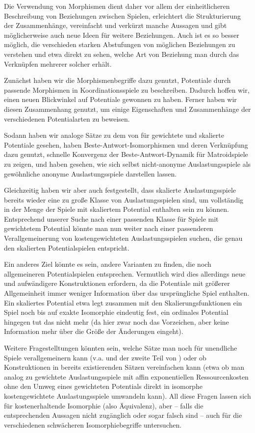 \documentclass[a4paper,ngerman,11pt,bibliography=totoc]{scrartcl}
\theoremstyle{definition}
\theoremstyle{plain}
\theoremstyle{remark}
\begin{document}
Die Verwendung von Morphismen dient daher vor allem der einheitlicheren Beschreibung von Beziehungen zwischen Spielen, erleichtert die Strukturierung der Zusammenhänge, vereinfacht und verkürzt manche Aussagen und gibt möglicherweise auch neue Ideen für weitere Beziehungen. Auch ist es so besser möglich, die verschieden starken Abstufungen von möglichen Beziehungen zu verstehen und etwa direkt zu sehen, welche Art von Beziehung man durch das Verknüpfen mehrerer solcher erhält.

Zunächst haben wir die Morphismenbegriffe dazu genutzt, Potentiale durch passende Morphismen in Koordinationsspiele zu beschreiben. Dadurch hoffen wir, einen neuen Blickwinkel auf Potentiale gewonnen zu haben. Ferner haben wir diesen Zusammenhang genutzt, um einige Eigenschaften und Zusammenhänge der verschiedenen Potentialarten zu beweisen.

Sodann haben wir analoge Sätze zu dem von \citeauthor{MonShap} für gewichtete und skalierte Potentiale gesehen, haben Beste-Antwort-Isomorphismen und deren Verknüpfung dazu genutzt, schnelle Konvergenz der Beste-Antwort-Dynamik für Matroidspiele zu zeigen, und haben gesehen, wie sich selbst nicht-anonyme Auslastungsspiele als gewöhnliche anonyme Auslastungsspiele darstellen lassen.

Gleichzeitig haben wir aber auch festgestellt, dass skalierte Auslastungsspiele bereits wieder eine zu große Klasse von Auslastungsspielen sind, um vollständig in der Menge der Spiele mit skaliertem Potential enthalten sein zu können. Entsprechend unserer Suche nach einer passenden Klasse für Spiele mit gewichtetem Potential könnte man nun weiter nach einer passenderen Verallgemeinerung von kostengewichteten Auslastungsspielen suchen, die genau den skalierten Potentialspielen entspricht. 

Ein anderes Ziel könnte es sein, andere Varianten zu finden, die noch allgemeineren Potentialspielen entsprechen. Vermutlich wird dies allerdings neue und aufwändigere Konstruktionen erfordern, da die Potentiale mit größerer Allgemeinheit immer weniger Information über das ursprüngliche Spiel enthalten. Ein skaliertes Potential etwa legt zusammen mit den Skalierungsfunktionen ein Spiel noch bis auf exakte Isomorphie eindeutig fest, ein ordinales Potential hingegen tut das nicht mehr (da hier zwar noch das Vorzeichen, aber keine Information mehr über die Größe der Änderungen eingeht).

Weitere Fragestelltungen könnten sein, welche Sätze man noch für unendliche Spiele verallgemeinern kann (v.a.  und der zweite Teil von ) oder ob Konstruktionen in bereits existierenden Sätzen vereinfachen kann (etwa ob man analog zu  gewichtete Auslastungsspiele mit affin exponentiellen Ressourcenkosten ohne den Umweg eines gewichteten Potentials direkt in isomorphe kostengewichtete Auslastungsspiele umwandeln kann). All diese Fragen lassen sich für kostenerhaltende Isomorphie (also Äquivalenz), aber -- falls die entsprechenden Aussagen nicht zugänglich oder sogar falsch sind -- auch für die verschiedenen schwächeren Isomorphiebegriffe untersuchen.

\newpage

{}
\printindex
{}

\printbibliography
\end{document}
